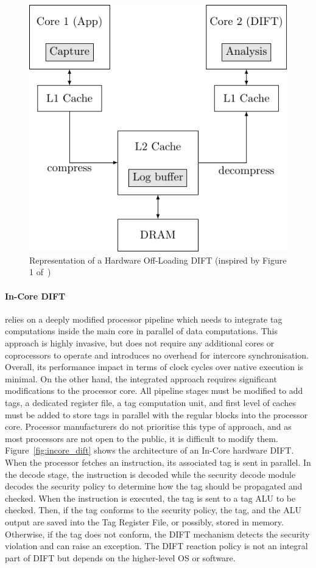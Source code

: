 \begin{figure}[ht]
    \centering
    \includegraphics{c2_soa/img/offloading.pdf}
    \caption{Representation of a Hardware Off-Loading DIFT (inspired by Figure 1 of~\cite{KDK-09-dsn})}
    \label{fig:offloading_dift}
\end{figure}

\paragraph{In-Core DIFT} relies on a deeply modified processor pipeline which needs to integrate tag computations inside the main core in parallel of data computations. This approach is highly invasive, but does not require any additional cores or coprocessors to operate and introduces no overhead for intercore synchronisation. Overall, its performance impact in terms of clock cycles over native execution is minimal. On the other hand, the integrated approach requires significant modifications to the processor core. All pipeline stages must be modified to add tags, a dedicated register file, a tag computation unit, and first level of caches must be added to store tags in parallel with the regular blocks into the processor core. Processor manufacturers do not prioritise this type of approach, and as most processors are not open to the public, it is difficult to modify them. Figure~\ref{fig:incore_dift} shows the architecture of an In-Core hardware DIFT. When the processor fetches an instruction, its associated tag is sent in parallel. In the decode stage, the instruction is decoded while the security decode module decodes the security policy to determine how the tag should be propagated and checked. When the instruction is executed, the tag is sent to a tag ALU to be checked. Then, if the tag conforms to the security policy, the tag, and the ALU output are saved into the Tag Register File, or possibly, stored in memory. Otherwise, if the tag does not conform, the DIFT mechanism detects the security violation and can raise an exception. The DIFT reaction policy is not an integral part of DIFT but depends on the higher-level OS or software.

